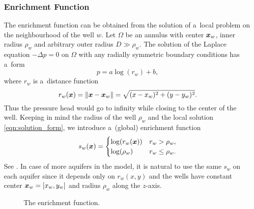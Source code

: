 \subsubsection{Enrichment Function} \label{sec:enrichment_func}
The enrichment function can be obtained from the solution of a~local problem on the neighbourhood of the well $w$.
Let $\Omega$ be an annulus with center $\mathbf{\boldsymbol{x}}_w$, inner radius $\rho_w$ and arbitrary outer radius $D \gg \rho_w$.
The solution of the Laplace equation $-\Delta p = 0$ on $\Omega$ with any radially symmetric boundary conditions has a~form
%
\begin{equation} \label{eqn:solution_form}
  p = a \log(r_w)+b, %
\end{equation}
where $r_w$ is a~distance function
\begin{equation} \label{eqn:distance}
r_w(\mathbf{\boldsymbol{x}}) = \|\mathbf{\boldsymbol{x}} - \mathbf{\boldsymbol{x}}_w\|= \sqrt{(x-x_w)^2+(y-y_w)^2}.
\end{equation}
%
Thus the pressure head would go to infinity while closing to the center of the well.
Keeping in mind the radius of the well $\rho_w$ and the local solution \eqref{eqn:solution_form}, 
we introduce a~(global) enrichment function
%
\begin{equation}
\label{eqn:enrich_func}
s_w(\mathbf{\boldsymbol{x}}) = 
  \begin{cases}
  \log(r_w(\mathbf{\boldsymbol{x}})) & r_w > \rho_w,\\
  \log(\rho_w) & r_w \le \rho_w.\\
  \end{cases}
\end{equation}
See .
In case of more aquifers in the model, it is natural to use the same $s_w$ on each aquifer 
since it depends only on $r_w(x,y)$ and the wells have constant center $\mathbf{\boldsymbol{x}}_w=[x_w, y_w]$ and radius $\rho_w$ along the $z$-axis.
%

\begin{figure}[!htb]
  \begin{center}         
    \def\svgwidth{0.5\textwidth}
    
  \end{center}
  \caption{The enrichment function.}
  \label{fig:enrich_func}
\end{figure}



